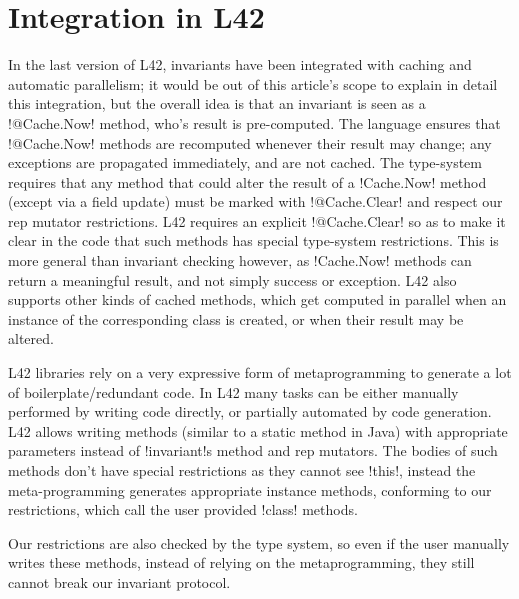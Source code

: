 \vspace{-1ex}
\section[Integration in L42]{Integration in L42}
\label{s:L42}
\vspace{-1ex}
In the last version of L42, invariants have been integrated with caching and automatic parallelism; it would be out of this article's scope to explain 
in detail this integration, but the overall idea is that an invariant
is seen as a \Q@Void@ \Q!@Cache.Now! method, who's result is pre-computed.
The language ensures that \Q!@Cache.Now! methods are recomputed whenever their result may change; any exceptions are propagated immediately, and are not cached.
The type-system requires that any method that could alter the result of a \Q!Cache.Now! method (except via a field update) must be marked with \Q!@Cache.Clear! and respect our rep mutator restrictions.
L42 requires an explicit \Q!@Cache.Clear! so as to make it clear in the code that such methods has special type-system restrictions.
This is more general than invariant checking however, as \Q!Cache.Now! methods can return a meaningful result, and not simply success or exception.
L42 also supports other kinds of cached methods, which get computed in parallel when an instance of the corresponding class is created, or when their result may be altered.

L42 libraries rely on a very expressive form of metaprogramming to generate a lot of boilerplate/redundant code. In L42 many tasks can be  either manually performed by writing code directly, or partially automated by code generation.
L42 allows writing \Q@class@ methods (similar to a static method in Java) with appropriate parameters instead of \Q!invariant!s method and rep mutators. The bodies of such methods don't have special restrictions as they cannot see \Q!this!, instead the meta-programming generates appropriate instance methods, conforming to our restrictions, which call the user provided \Q!class! methods.

Our restrictions are also checked by the type system, so even if the user manually writes these methods, instead of relying on the metaprogramming, they still cannot break our invariant protocol.

